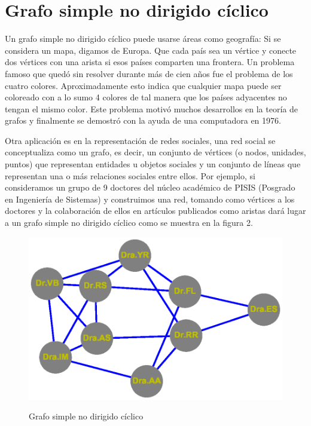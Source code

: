 \documentclass{article}
\begin{document}
\section{Grafo simple no dirigido cíclico}
Un grafo simple no dirigido cíclico puede usarse áreas como geografía: Si se considera un mapa, digamos de Europa. Que cada país sea un vértice y conecte dos vértices con una arista si esos países comparten una frontera. Un problema famoso que quedó sin resolver durante más de cien años fue el problema de los cuatro colores. Aproximadamente esto indica que cualquier mapa puede ser coloreado con a lo sumo 4 colores de tal manera que los países adyacentes no tengan el mismo color. Este problema motivó muchos desarrollos en la teoría de grafos y finalmente se demostró con la ayuda de una computadora en 1976\cite{rf1}.\linebreak

Otra aplicación es en la representación de redes sociales, una red social se conceptualiza como un grafo, es decir, un conjunto de vértices (o nodos, unidades, puntos) que representan entidades u objetos sociales y un conjunto de líneas que representan una o más relaciones sociales entre ellos\cite {article1}.\linebreak
Por ejemplo, si consideramos un grupo de 9 doctores del núcleo académico de PISIS (Posgrado en Ingeniería de Sistemas) y construimos una red, tomando como vértices a los doctores y la colaboración de ellos en artículos publicados como aristas dará lugar a un grafo simple no dirigido cíclico como se muestra en la figura 2.

    
\begin{center}

\end{center}
\begin{figure}[h]
\begin{center}
\includegraphics[scale=0.7]{Graf2.eps}\\
\caption{Grafo simple no dirigido cíclico}
\end{center}

\end{figure}
\end{document}
